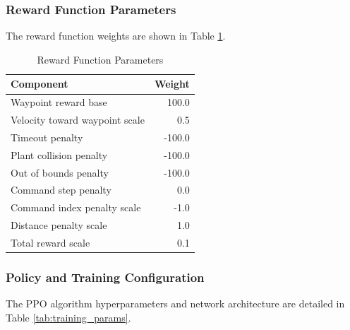 \documentclass[11pt,a4paper,twocolumn]{article}
\begin{document}
\subsubsection{Reward Function Parameters}
The reward function weights are shown in Table \ref{tab:reward_params}.

\begin{table}[h]
\centering
\caption{Reward Function Parameters}
\label{tab:reward_params}
\small
\begin{tabular}{|l|r|}
\hline
\textbf{Component} & \textbf{Weight} \\
\hline
Waypoint reward base & 100.0 \\
Velocity toward waypoint scale & 0.5 \\
Timeout penalty & -100.0 \\
Plant collision penalty & -100.0 \\
Out of bounds penalty & -100.0 \\
Command step penalty & 0.0 \\
Command index penalty scale & -1.0 \\
Distance penalty scale & 1.0 \\
Total reward scale & 0.1 \\
\hline
\end{tabular}
\end{table}

\subsubsection{Policy and Training Configuration}
The PPO algorithm hyperparameters and network architecture are detailed in Table \ref{tab:training_params}.
\end{document}
